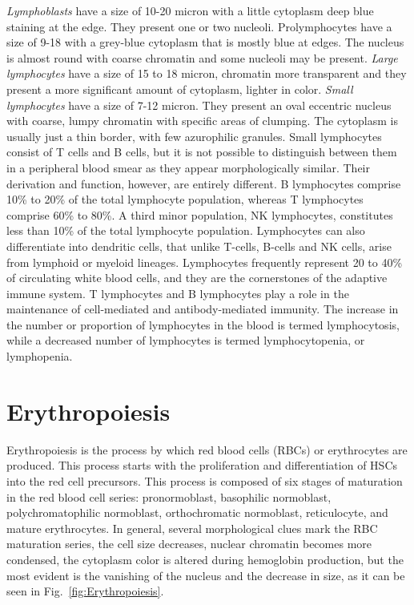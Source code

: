 \textit{Lymphoblasts} have a size of 10-20 micron with a little cytoplasm deep blue staining at the edge. They present one or two nucleoli. Prolymphocytes have a size of 9-18 with a grey-blue cytoplasm that is mostly blue at edges. The nucleus is almost round with coarse chromatin and some nucleoli may be present. \textit{Large lymphocytes} have a size of 15 to 18 micron, chromatin more transparent and they present a more significant amount of cytoplasm, lighter in color. \textit{Small lymphocytes} have a size of 7-12 micron. They present an oval eccentric nucleus with coarse, lumpy chromatin with specific areas of clumping.
The cytoplasm is usually just a thin border, with few azurophilic granules. Small lymphocytes consist of T cells and B cells, but it is not possible to distinguish between them in a peripheral blood smear as they appear morphologically similar. Their derivation and function, however, are entirely different. B lymphocytes comprise 10\% to 20\% of the total lymphocyte population, whereas T lymphocytes comprise 60\% to 80\%. A third minor population, NK lymphocytes, constitutes less than 10\% of the total lymphocyte population. Lymphocytes can also differentiate into dendritic cells, that unlike T-cells, B-cells and NK cells, arise from lymphoid or myeloid lineages. Lymphocytes frequently represent 20 to 40\% of circulating white blood cells, and they are the cornerstones of the adaptive immune system. T lymphocytes and B lymphocytes play a role in the maintenance of cell-mediated and antibody-mediated immunity. The increase in the number or proportion of lymphocytes in the blood is termed lymphocytosis, while a decreased number of lymphocytes is termed lymphocytopenia, or lymphopenia.

\section{Erythropoiesis}
Erythropoiesis is the process by which red blood cells (RBCs) or erythrocytes are produced. This process starts with the proliferation and differentiation of HSCs into the red cell precursors. This process is composed of six stages of maturation in the red blood cell series: pronormoblast, basophilic normoblast, polychromatophilic normoblast, orthochromatic normoblast, reticulocyte, and mature erythrocytes. In general, several morphological clues mark the RBC maturation series, the cell size decreases, nuclear chromatin becomes more condensed, the cytoplasm color is altered during hemoglobin production, but the most evident is the vanishing of the nucleus and the decrease in size, as it can be seen in Fig.~\ref{fig:Erythropoiesis}.

